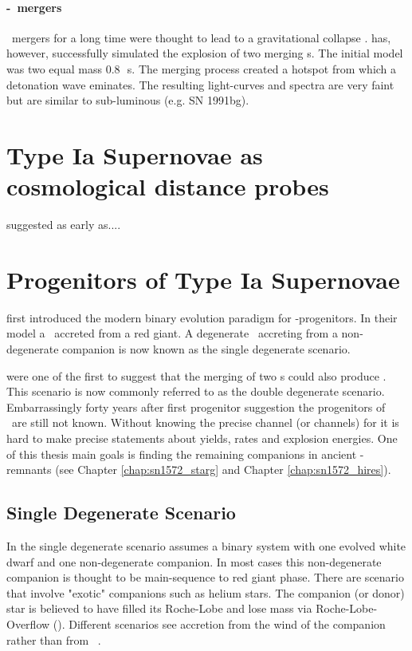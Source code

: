 \paragraph{\WD-\WD\ mergers}
\cowd\ mergers for a long time were thought to lead to a gravitational collapse \citep[same mechanism as the \onemgwd][]{1985A&A...150L..21S}. \citet{2010Natur.463...61P} has, however, successfully simulated the explosion of two merging \cowd s. The initial model was two equal mass 0.8\,\msun\ \cowd s. The merging process created a hotspot from which a detonation wave eminates. 
The resulting light-curves and spectra are very faint but are similar to sub-luminous \snia (e.g. SN 1991bg). 

\section{Type Ia Supernovae as cosmological distance probes}

suggested as early as....

\section{Progenitors of Type Ia Supernovae}
\label{sec:snia_progenitor}

\citet{1973ApJ...186.1007W} first introduced the modern binary evolution paradigm for \snia-progenitors. In their model a \cowd\ accreted from a red giant. A degenerate \cowd\ accreting from a non-degenerate companion is now known as the single degenerate scenario. 

\cite{1985ApJ...297..531N} were one of the first to suggest that the merging of two \cowd s could also produce \sneia. This scenario is now commonly referred to as the double degenerate scenario. 
Embarrassingly forty years after first progenitor suggestion the progenitors of \snia\ are still not known. Without knowing the precise channel (or channels) for \snia it is hard to make precise statements about yields, rates and explosion energies. One of this thesis main goals is finding the remaining companions in ancient \snia-remnants (see Chapter \ref{chap:sn1572_starg} and Chapter \ref{chap:sn1572_hires}). 


\subsection{Single Degenerate Scenario}
In the single degenerate scenario assumes a binary system with one evolved white dwarf and one non-degenerate companion. In most cases this non-degenerate companion is thought to be main-sequence to red giant phase. There are scenario that involve "exotic" companions such as helium stars. The companion (or donor) star is believed to have filled its Roche-Lobe and lose mass via Roche-Lobe-Overflow (\rlof). Different scenarios see accretion from the wind of the companion rather than from \rlof\ \citep{2011apn5.confE.295M}.

